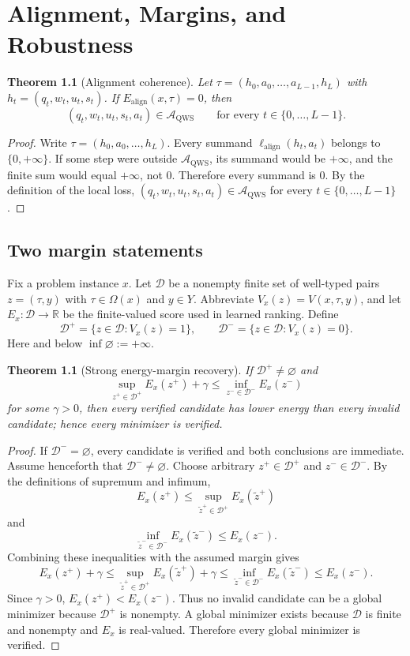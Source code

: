 \documentclass[11pt,oneside]{book}
\newtheorem{theorem}[definition]{Theorem}
\theoremstyle{remark}
\newcommand{\AQWS}{\mathcal A_{\mathrm{QWS}}}
\newcommand{\Om}{\Omega}
\begin{document}
\chapter{Alignment, Margins, and Robustness}

\begin{theorem}[Alignment coherence]
Let $\tau=(h_0,a_0,\ldots,a_{L-1},h_L)$ with
$h_t=(q_t,w_t,u_t,s_t)$. If
$E_{\mathrm{align}}(x,\tau)=0$, then
\[
(q_t,w_t,u_t,s_t,a_t)\in\AQWS
\qquad\text{for every }t\in\{0,\ldots,L-1\}.
\]
\end{theorem}

\begin{proof}
Write $\tau=(h_0,a_0,\ldots,h_L)$. Every summand
$\ell_{\mathrm{align}}(h_t,a_t)$ belongs to $\{0,+\infty\}$. If some step
were outside $\AQWS$, its summand would be $+\infty$, and the finite sum would
equal $+\infty$, not $0$. Therefore every summand is $0$. By the definition
of the local loss,
$(q_t,w_t,u_t,s_t,a_t)\in\AQWS$ for every
$t\in\{0,\ldots,L-1\}$.
\end{proof}

\section{Two margin statements}

Fix a problem instance $x$. Let $\mathcal D$ be a nonempty finite set of
well-typed pairs $z=(\tau,y)$ with $\tau\in\Om(x)$ and $y\in Y$. Abbreviate
$V_x(z)=V(x,\tau,y)$, and let
$E_x:\mathcal D\to\mathbb R$ be the finite-valued score used in learned
ranking. Define
\[
\mathcal D^+=\{z\in\mathcal D:V_x(z)=1\},
\qquad
\mathcal D^-=\{z\in\mathcal D:V_x(z)=0\}.
\]
Here and below $\inf\varnothing:=+\infty$.

\begin{theorem}[Strong energy-margin recovery]
If $\mathcal D^+\ne\varnothing$ and
\[
\sup_{z^+\in\mathcal D^+}E_x(z^+)+\gamma
\le\inf_{z^-\in\mathcal D^-}E_x(z^-)
\]
for some $\gamma>0$, then every verified candidate has lower energy than
every invalid candidate; hence every minimizer is verified.
\end{theorem}

\begin{proof}
If $\mathcal D^-=\varnothing$, every candidate is verified and both
conclusions are immediate. Assume henceforth that
$\mathcal D^-\ne\varnothing$.
Choose arbitrary $z^+\in\mathcal D^+$ and
$z^-\in\mathcal D^-$. By the definitions of supremum and infimum,
\[
E_x(z^+)
\le\sup_{\widetilde z^+\in\mathcal D^+}E_x(\widetilde z^+)
\]
and
\[
\inf_{\widetilde z^-\in\mathcal D^-}E_x(\widetilde z^-)
\le E_x(z^-).
\]
Combining these inequalities with the assumed margin gives
\[
E_x(z^+)+\gamma
\le\sup_{\widetilde z^+\in\mathcal D^+}E_x(\widetilde z^+)+\gamma
\le\inf_{\widetilde z^-\in\mathcal D^-}E_x(\widetilde z^-)
\le E_x(z^-).
\]
Since $\gamma>0$, $E_x(z^+)<E_x(z^-)$. Thus no invalid candidate can be a
global minimizer because $\mathcal D^+$ is nonempty. A global minimizer
exists because $\mathcal D$ is finite and nonempty and $E_x$ is real-valued.
Therefore every global minimizer is verified.
\end{proof}
\end{document}
